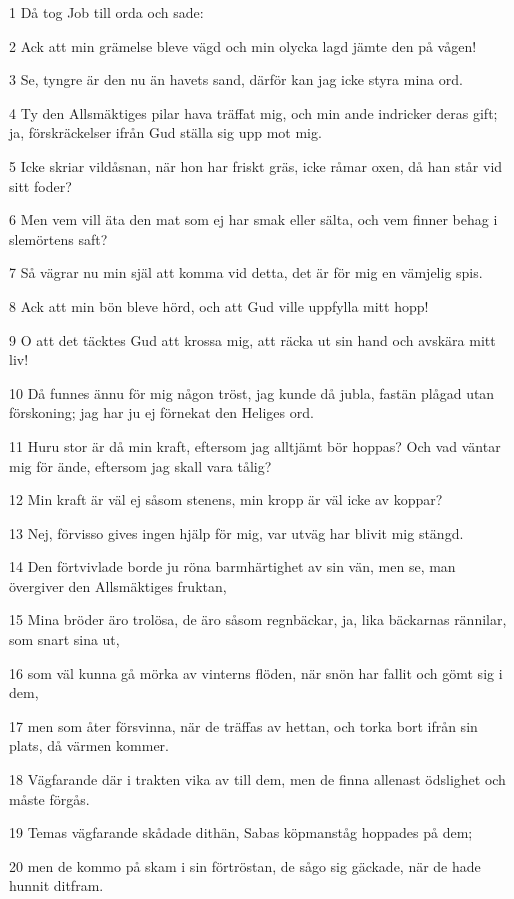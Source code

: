 \par 1 Då tog Job till orda och sade:
\par 2 Ack att min grämelse bleve vägd och min olycka lagd jämte den på vågen!
\par 3 Se, tyngre är den nu än havets sand, därför kan jag icke styra mina ord.
\par 4 Ty den Allsmäktiges pilar hava träffat mig, och min ande indricker deras gift; ja, förskräckelser ifrån Gud ställa sig upp mot mig.
\par 5 Icke skriar vildåsnan, när hon har friskt gräs, icke råmar oxen, då han står vid sitt foder?
\par 6 Men vem vill äta den mat som ej har smak eller sälta, och vem finner behag i slemörtens saft?
\par 7 Så vägrar nu min själ att komma vid detta, det är för mig en vämjelig spis.
\par 8 Ack att min bön bleve hörd, och att Gud ville uppfylla mitt hopp!
\par 9 O att det täcktes Gud att krossa mig, att räcka ut sin hand och avskära mitt liv!
\par 10 Då funnes ännu för mig någon tröst, jag kunde då jubla, fastän plågad utan förskoning; jag har ju ej förnekat den Heliges ord.
\par 11 Huru stor är då min kraft, eftersom jag alltjämt bör hoppas? Och vad väntar mig för ände, eftersom jag skall vara tålig?
\par 12 Min kraft är väl ej såsom stenens, min kropp är väl icke av koppar?
\par 13 Nej, förvisso gives ingen hjälp för mig, var utväg har blivit mig stängd.
\par 14 Den förtvivlade borde ju röna barmhärtighet av sin vän, men se, man övergiver den Allsmäktiges fruktan,
\par 15 Mina bröder äro trolösa, de äro såsom regnbäckar, ja, lika bäckarnas rännilar, som snart sina ut,
\par 16 som väl kunna gå mörka av vinterns flöden, när snön har fallit och gömt sig i dem,
\par 17 men som åter försvinna, när de träffas av hettan, och torka bort ifrån sin plats, då värmen kommer.
\par 18 Vägfarande där i trakten vika av till dem, men de finna allenast ödslighet och måste förgås.
\par 19 Temas vägfarande skådade dithän, Sabas köpmanståg hoppades på dem;
\par 20 men de kommo på skam i sin förtröstan, de sågo sig gäckade, när de hade hunnit ditfram.

